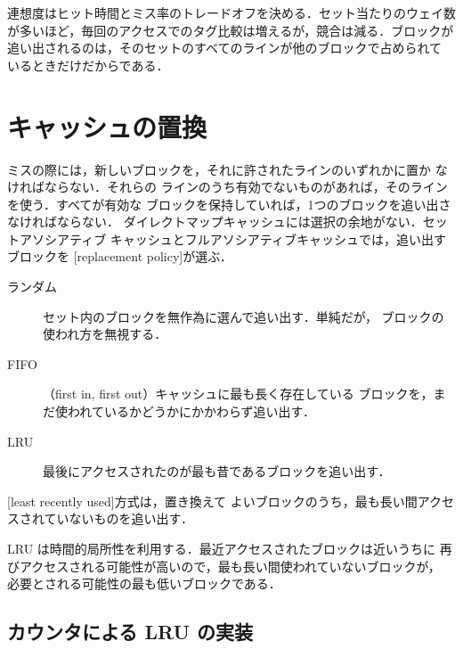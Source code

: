 \documentclass[../main.tex]{subfiles}
\begin{document}
\begin{keypoint}
  連想度はヒット時間とミス率のトレードオフを決める．セット当たりのウェイ数
  が多いほど，毎回のアクセスでのタグ比較は増えるが，競合は減る．ブロックが
  追い出されるのは，そのセットのすべてのラインが他のブロックで占められて
  いるときだけだからである．
\end{keypoint}

\section{キャッシュの置換}
\label{sec:l12-replacement}

ミスの際には，新しいブロックを，それに許されたラインのいずれかに置か
なければならない．それらの
ラインのうち有効でないものがあれば，そのラインを使う．すべてが有効な
ブロックを保持していれば，1つのブロックを追い出さなければならない．
ダイレクトマップキャッシュには選択の余地がない．セットアソシアティブ
キャッシュとフルアソシアティブキャッシュでは，追い出すブロックを
[replacement policy]が選ぶ．
\begin{description}
  \item[ランダム] セット内のブロックを無作為に選んで追い出す．単純だが，
    ブロックの使われ方を無視する．
  \item[FIFO]（first in, first out）キャッシュに最も長く存在している
    ブロックを，まだ使われているかどうかにかかわらず追い出す．
  \item[LRU] 最後にアクセスされたのが最も昔であるブロックを追い出す．
\end{description}

\begin{definition}[LRU]
  [least recently used]方式は，置き換えて
  よいブロックのうち，最も長い間アクセスされていないものを追い出す．
\end{definition}

LRU は時間的局所性を利用する．最近アクセスされたブロックは近いうちに
再びアクセスされる可能性が高いので，最も長い間使われていないブロックが，
必要とされる可能性の最も低いブロックである．

\subsection{カウンタによる LRU の実装}
\end{document}
